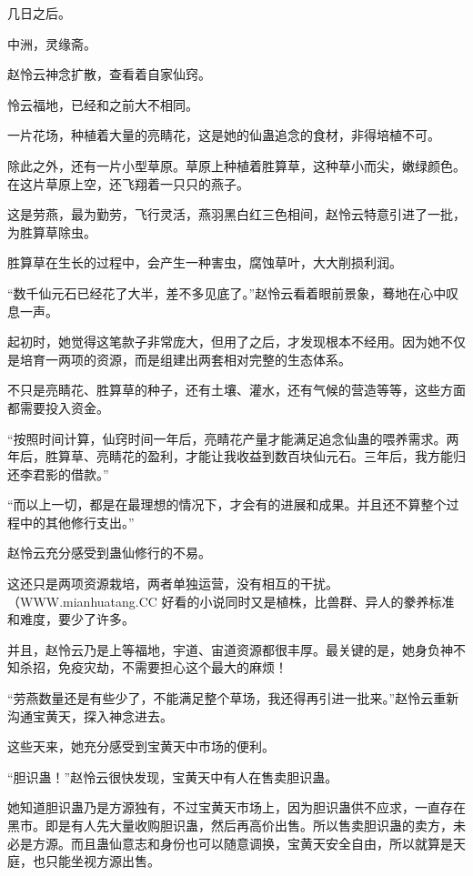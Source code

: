 
\begin{this_body}

几日之后。

中洲，灵缘斋。

赵怜云神念扩散，查看着自家仙窍。

怜云福地，已经和之前大不相同。

一片花场，种植着大量的亮睛花，这是她的仙蛊追念的食材，非得培植不可。

除此之外，还有一片小型草原。草原上种植着胜算草，这种草小而尖，嫩绿颜色。在这片草原上空，还飞翔着一只只的燕子。

这是劳燕，最为勤劳，飞行灵活，燕羽黑白红三色相间，赵怜云特意引进了一批，为胜算草除虫。

胜算草在生长的过程中，会产生一种害虫，腐蚀草叶，大大削损利润。

“数千仙元石已经花了大半，差不多见底了。”赵怜云看着眼前景象，蓦地在心中叹息一声。

起初时，她觉得这笔款子非常庞大，但用了之后，才发现根本不经用。因为她不仅是培育一两项的资源，而是组建出两套相对完整的生态体系。

不只是亮睛花、胜算草的种子，还有土壤、灌水，还有气候的营造等等，这些方面都需要投入资金。

“按照时间计算，仙窍时间一年后，亮睛花产量才能满足追念仙蛊的喂养需求。两年后，胜算草、亮睛花的盈利，才能让我收益到数百块仙元石。三年后，我方能归还李君影的借款。”

“而以上一切，都是在最理想的情况下，才会有的进展和成果。并且还不算整个过程中的其他修行支出。”

赵怜云充分感受到蛊仙修行的不易。

这还只是两项资源栽培，两者单独运营，没有相互的干扰。（WWW.mianhuatang.CC 好看的小说同时又是植株，比兽群、异人的豢养标准和难度，要少了许多。

并且，赵怜云乃是上等福地，宇道、宙道资源都很丰厚。最关键的是，她身负神不知杀招，免疫灾劫，不需要担心这个最大的麻烦！

“劳燕数量还是有些少了，不能满足整个草场，我还得再引进一批来。”赵怜云重新沟通宝黄天，探入神念进去。

这些天来，她充分感受到宝黄天中市场的便利。

“胆识蛊！”赵怜云很快发现，宝黄天中有人在售卖胆识蛊。

她知道胆识蛊乃是方源独有，不过宝黄天市场上，因为胆识蛊供不应求，一直存在黑市。即是有人先大量收购胆识蛊，然后再高价出售。所以售卖胆识蛊的卖方，未必是方源。而且蛊仙意志和身份也可以随意调换，宝黄天安全自由，所以就算是天庭，也只能坐视方源出售。


\end{this_body}
